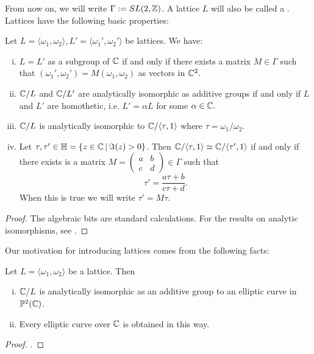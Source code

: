 \documentclass[12pt, a4paper]{report}
\begin{document}
From now on, we will write $\Gamma := SL(2,{\mathbb Z})$.
A lattice $L$ will also be called a .
Lattices have the following basic properties:
\begin{prop} \label{lattice}
  Let $L = \langle \omega_1, \omega_2 \rangle, L' = \langle \omega_1', \omega_2'
  \rangle$ be lattices. We have:
  \begin{enumerate}[(i)]
  \item $L = L'$ as a subgroup of ${\mathbb C}$ if and only if there exists a matrix $M
    \in \Gamma$ such that $(\omega_1', \omega_2') = M (\omega_1, \omega_2)$
    as vectors in ${\mathbb C}^2.$
  \item ${\mathbb C} / L$ and ${\mathbb C} / L'$ are analytically isomorphic as additive groups
    if and only if $L$ and $L'$ are homothetic, i.e.
    $L' = \alpha L$ for some $\alpha \in {\mathbb C}.$
  \item ${\mathbb C} / L$ is analytically isomorphic to ${\mathbb C} /\langle \tau, 1
    \rangle$ where $\tau = \omega_1/\omega_2$.
  \item Let $\tau, \tau' \in \mathbb{H} = \{z \in {\mathbb C} \, | \, \Im(z) > 0 \}$.
    Then ${\mathbb C} / \langle \tau, 1 \rangle \simeq {\mathbb C} / \langle \tau', 1 \rangle$
  if and only if there exists is a matrix $M = \left(
    \begin{smallmatrix}
      a & b \\ c & d
    \end{smallmatrix} \right) \in \Gamma$
    such that
    \[\tau' = \frac{a\tau+b}{c\tau +d}. \]
    When this is true we will write $\tau' = M\tau$.
  \end{enumerate}
\end{prop}
\begin{proof}
  The algebraic bits are standard calculations. For the results on analytic
  isomorphisms, see \cite[Appendix B.6, pages 168-169]{simple}.
\end{proof}

Our motivation for introducing lattices comes from the following facts:

\begin{prop}
  Let $L = \langle \omega_1, \omega_2 \rangle$ be a lattice. Then
  \begin{enumerate}[(i)]
  \item ${\mathbb C}/L$ is analytically isomorphic as an additive group
    to an elliptic curve in ${\mathbb P}^2({\mathbb C})$.
  \item Every elliptic curve over ${\mathbb C}$ is obtained in this way.
  \end{enumerate}
\end{prop}
\begin{proof}
  \cite[See][Pages 131-134 and 136-137]{Granville}.
\end{proof}
\end{document}
